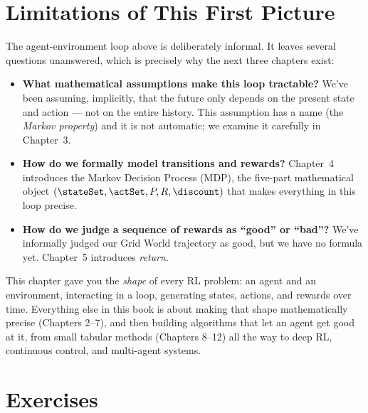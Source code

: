 \section{Limitations of This First Picture}

The agent-environment loop above is deliberately informal. It leaves
several questions unanswered, which is precisely why the next three
chapters exist:

\begin{itemize}
  \item \textbf{What mathematical assumptions make this loop tractable?}
  We've been assuming, implicitly, that the future only depends on the
  present state and action — not on the entire history. This assumption
  has a name (the \emph{Markov property}) and it is not automatic; we
  examine it carefully in Chapter~3.
  \item \textbf{How do we formally model transitions and rewards?}
  Chapter~4 introduces the Markov Decision Process (MDP), the
  five-part mathematical object $(\stateSet, \actSet, P, R, \discount)$
  that makes everything in this loop precise.
  \item \textbf{How do we judge a sequence of rewards as ``good'' or
  ``bad''?} We've informally judged our Grid World trajectory as good, but
  we have no formula yet. Chapter~5 introduces \emph{return}.
\end{itemize}

\begin{keyidea}
This chapter gave you the \emph{shape} of every RL problem: an agent and
an environment, interacting in a loop, generating states, actions, and
rewards over time. Everything else in this book is about making that
shape mathematically precise (Chapters 2–7), and then building
algorithms that let an agent get good at it, from small tabular
methods (Chapters 8–12) all the way to deep RL, continuous control, and
multi-agent systems.
\end{keyidea}

\section*{Exercises}


